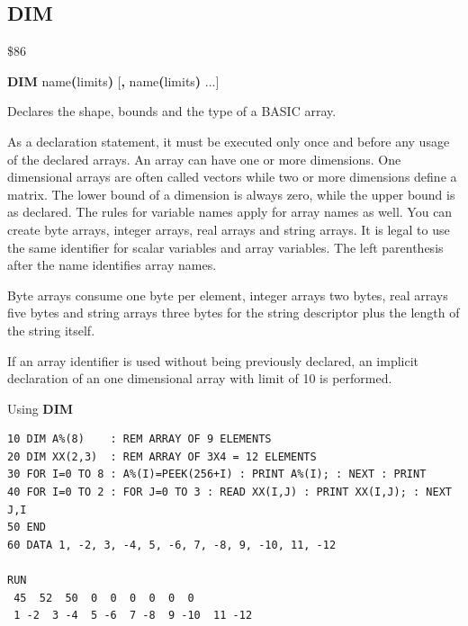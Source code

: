
\newpage
\subsection{DIM}
\begin{description}[leftmargin=2cm,style=nextline]
\item [Token:]   \$86

\item [Format:]  {\bf DIM} name{\bf(}limits{\bf)} [{\bf,} name{\bf(}limits{\bf)} ...]

\item [Usage:]   Declares the shape, bounds and the type of a BASIC array.

                 As a declaration statement, it must be executed only once and before any usage of the declared arrays. An array can have one or more dimensions. One dimensional arrays are often called vectors while two or more dimensions define a matrix. The lower bound of a dimension is always zero, while the upper bound is as declared. The rules for variable names apply for array names as well. You can create byte arrays, integer arrays, real arrays and string arrays. It is legal to use the same identifier for scalar variables and array variables. The left parenthesis after the name identifies array names.

\item [Remarks:] Byte arrays consume one byte per element, integer arrays two bytes, real arrays five bytes and string arrays three bytes for the string descriptor plus the length of the string itself.
                 
                 If an array identifier is used without being previously declared, an implicit declaration of an one dimensional array with limit of 10 is performed.

\item [Example:] Using {\bf DIM}

\begin{tcolorbox}[colback=black,coltext=white]
\verbatimfont{\codefont}
\begin{verbatim}
10 DIM A%(8)    : REM ARRAY OF 9 ELEMENTS
20 DIM XX(2,3)  : REM ARRAY OF 3X4 = 12 ELEMENTS
30 FOR I=0 TO 8 : A%(I)=PEEK(256+I) : PRINT A%(I); : NEXT : PRINT
40 FOR I=0 TO 2 : FOR J=0 TO 3 : READ XX(I,J) : PRINT XX(I,J); : NEXT J,I
50 END
60 DATA 1, -2, 3, -4, 5, -6, 7, -8, 9, -10, 11, -12

RUN
 45  52  50  0  0  0  0  0  0
 1 -2  3 -4  5 -6  7 -8  9 -10  11 -12
\end{verbatim}
\end{tcolorbox}
\end{description}

